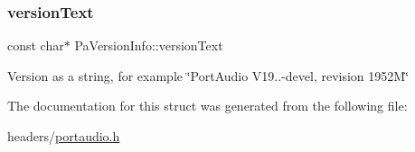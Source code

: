 \subsubsection{\texorpdfstring{version\+Text}{versionText}}
{\footnotesize\ttfamily const char$\ast$ Pa\+Version\+Info\+::version\+Text}

Version as a string, for example \char`\"{}\+Port\+Audio V19..-\/devel, revision 1952\+M\char`\"{} 

The documentation for this struct was generated from the following file\+:\begin{DoxyCompactItemize}
\item 
headers/\hyperlink{portaudio_8h}{portaudio.\+h}\end{DoxyCompactItemize}
